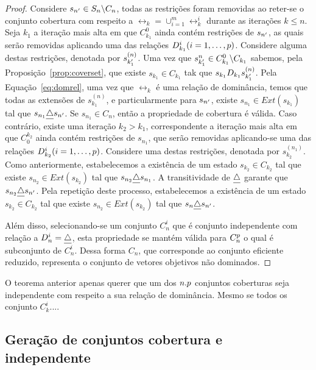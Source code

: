 \begin{proof}
  Considere $s_{{n'}} \in S_n\backslash C_n$, todas as restrições
  foram removidas ao reter-se o conjunto cobertura com respeito a
  $\rel_k = \cup_{i=1}^m \rel_k^i$ durante as iterações $k \leq n$.
  Seja $k_1$ a iteração mais alta em que $C_{k_1}^0$ ainda
  contém restrições de $s_{{n'}}$, as quais serão removidas
  aplicando uma das relações $D_{k_1}^i (i = 1, \ldots, p)$.
  Considere alguma destas restrições, denotada por $s_{{k_1'}}^{(n)}$.
  Uma vez que $s_{{k_1'}}^{n} \in C^0_{k_1}\backslash C_{k_1}$ sabemos,
  pela Proposição~\ref{prop:coverset}, que existe $s_{k_1} \in C_{k_1}$
  tak que $s_{k_1} D_{k_1} s_{{k_1'}}^{(n)}$.
  Pela Equação~\ref{eq:domrel}, uma vez que $\rel_{k}$ é uma relação de
  dominância, temos que todas as extensões de $s_{k_1}^{(n)}$, e
  particularmente para $s_{{n'}}$, existe $s_{n_1} \in Ext(s_{k_1})$
  tal que $s_{n_1} \underline{\triangle} s_{{n'}}$.
  Se $s_{n_1} \in C_n$, então a propriedade de cobertura é válida.
  Caso contrário, existe uma iteração $k_2 > k_1$, correspondente
  a iteração mais alta em que $C_0^{k_2}$ ainda contém restrições de $s_{n_1}$,
  que serão removidas aplicando-se uma das relações $D_{k_2}^i (i = 1, \ldots, p)$.
  Considere uma destas restrições, denotada por $s_{k_2}^{(n_1)}$.
  Como anteriormente, estabelecemos a existência de um estado $s_{k_2} \in C_{k_2}$
  tal que existe $s_{n_2} \in Ext(s_{k_2})$ tal que $s_{n_2} \underline{\triangle} s_{n_1}$.
  A transitividade de $\underline{\triangle}$ garante que $s_{n_2} \underline{\triangle} s_{{n'}}$.
  Pela repetição deste processo, estabelecemos a existência de um estado
  $s_{k_2} \in C_{k_2}$ tal que existe $s_{n_2} \in Ext(s_{k_2})$
  tal que $s_n \underline{\triangle} s_{{n'}}$.

  Além disso, selecionando-se um conjunto $C_n^i$ que é conjunto independente
  com relação a $D_n^i = \underline{\triangle}$, esta propriedade se mantém válida para $C_n^p$
  o qual é subconjunto de $C_n^i$.
  Dessa forma $C_n$, que corresponde ao conjunto eficiente reduzido,
  representa o conjunto de vetores objetivos não dominados.
  \qedhere
\end{proof}

O teorema anterior apenas querer que um dos $n . p$ conjuntos coberturas
seja independente com respeito a sua relação de dominância.
Mesmo se todos os conjunto $C_k^i$....

\subsection{Geração de conjuntos cobertura e independente}

